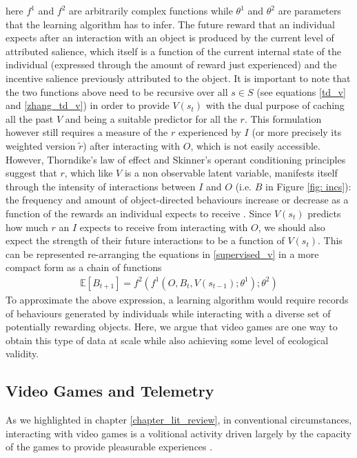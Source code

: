 here $f^{1}$ and $f^{2}$ are arbitrarily complex functions while $\theta^{1}$ and $\theta^{2}$ are parameters that the learning algorithm has to infer. The future reward that an individual expects after an interaction with an object is produced by the current level of attributed salience, which  itself is a function of the current internal state of the individual (expressed through the amount of reward just experienced) and the incentive salience previously attributed to the object. It is important to note that the two functions above need to be recursive over all $s \in S$ (see equations \ref{td_v} and \ref{zhang_td_v}) in order to provide $V(s_{t})$ with the dual purpose of caching all the past $V$ and being a suitable predictor for all the $r$. This formulation however still requires a measure of the $r$ experienced by $I$ (or more precisely its weighted version $\tilde{r}$) after interacting with $O$, which is not easily accessible. However, Thorndike's law of effect \cite{thorndike1927law} and Skinner's operant conditioning principles \cite{skinner1965science} suggest that $r$, which  like $V$ is a non observable latent variable, manifests itself through the intensity of interactions between $I$ and $O$ (i.e. $B$ in Figure \ref{fig: incs}): the frequency and amount of object-directed behaviours increase or decrease as a function of the rewards an individual expects to receive \cite{berridge2004motivation,schultz2017reward}. Since $V(s_{t})$ predicts how much $r$ an $I$ expects to receive from interacting with $O$, we should also expect the strength of their future interactions to be a function of $V(s_{t})$. This can be represented re-arranging the equations in \ref{supervised_v} in a more compact form as a chain of functions
\begin{align}
\label{supervised_b}
    \mathbb{E}[B_{t+1}] = f^{2}(f^{1}(O, B_{t}, V(s_{t-1}); \theta^{1});  \theta^{2})
\end{align}
To approximate the above expression, a learning algorithm would require records of behaviours generated by individuals while interacting with a diverse set of potentially rewarding objects. Here, we argue that video games are one way to obtain this type of data at scale while also achieving some level of ecological validity.

\subsection{Video Games and Telemetry}
\label{videogame_telemetries}
As we highlighted in chapter \ref{chapter_lit_review}, in conventional circumstances, interacting with video games is a volitional activity driven largely by the capacity of the games to provide pleasurable experiences \cite{boyle2012engagement}. 

